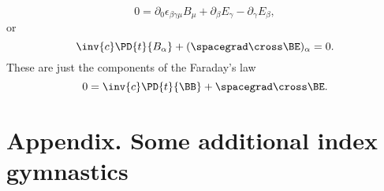 \begin{equation}\label{eqn:relativisticElectrodynamicsL11:1340}
0 =
\partial_0 \epsilon_{\beta\gamma\mu} B_\mu
+\partial_\beta E_\gamma
- \partial_\gamma E_{\beta},
\end{equation}
%
or
%
\begin{equation}\label{eqn:relativisticElectrodynamicsL11:1360}
\inv{c} \PD{t}{B_\alpha} + (\spacegrad \cross \BE)_\alpha = 0.
\end{equation}
%
These are just the components of the Faraday's law
%
\begin{equation}\label{eqn:relativisticElectrodynamicsL11:930}
0 = \inv{c} \PD{t}{\BB} + \spacegrad \cross \BE.
\end{equation}
%
\section{Appendix. Some additional index gymnastics}
%
